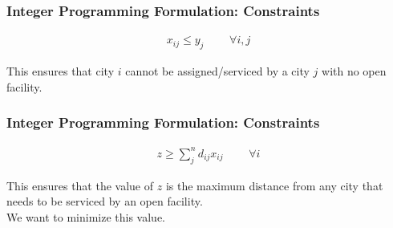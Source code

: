 \documentclass[12pt]{beamer}
\begin{document}
\begin{frame}
\frametitle{Integer Programming Formulation: Constraints}
$$
\begin{aligned}
x_{ij} \leq y_j & \texttt{     } & \forall i,j
\end{aligned}
\label{eq:$p$-Center Problem IP Open Facility Constraint}
$$
\begin{center}
This ensures that city $i$ cannot be assigned/serviced by a city $j$ with no open facility.
\end{center}
\end{frame}

\begin{frame}
\frametitle{Integer Programming Formulation: Constraints}
$$
\begin{aligned}
z \geq \sum_j^n d_{ij}x_{ij} & \texttt{     } & \forall i
\end{aligned}
\label{eq:$p$-Center Problem IP Largest Possible Z-value}
$$
\begin{center}
This ensures that the value of $z$ is the maximum distance from any city that needs to be serviced by an open facility.
\\[3ex]
We want to \alert{minimize} this value.
\end{center}
\end{frame}


%
%
\end{document}
